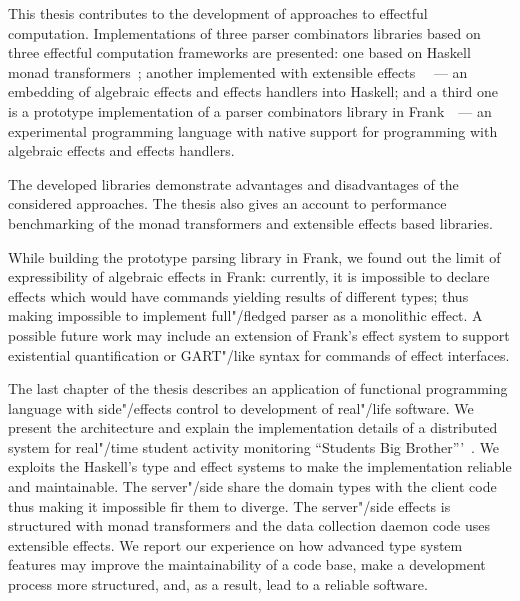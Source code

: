 \Conc

This thesis contributes to the development of approaches to effectful computation.
Implementations of three parser combinators libraries based on three
effectful computation frameworks are presented: one based on Haskell
monad transformers~\cite{mdParse};
another implemented with extensible effects~\cite{extEffParsers}~
--- an embedding of algebraic effects
and effects handlers into Haskell; and a third one is a prototype implementation
of a parser combinators library in Frank~\cite{frankoparsec}~---
an experimental programming language
with native support for programming with algebraic effects and effects handlers.

The developed libraries demonstrate advantages and disadvantages of the considered
approaches. The thesis also gives an account to performance benchmarking of the monad
transformers and extensible effects based libraries.

While building the prototype parsing library in Frank, we found out the limit of
expressibility of algebraic effects in Frank: currently, it is impossible to
declare effects which would have commands yielding results of different types;
thus making impossible to implement full"/fledged parser as a monolithic effect.
A possible future work may include an extension of Frank's effect system to support
existential quantification or GART"/like syntax for commands of effect interfaces.

The last chapter of the thesis describes an application of functional programming
language with side"/effects control to development of real"/life software. We
present the architecture and explain the implementation details of a distributed
system for real"/time student activity monitoring
``Students Big Brother'''~\cite{sbbRepo}. We exploits the Haskell's type and effect
systems to make the implementation reliable and maintainable. The server"/side share
the domain types with the client code thus making it impossible fir them to diverge.
The server"/side effects is structured with monad transformers and the data collection
daemon code uses extensible effects. We report our experience on how advanced type system
features may improve the maintainability of a code base, make a development process
more structured, and, as a result, lead to a reliable software.

